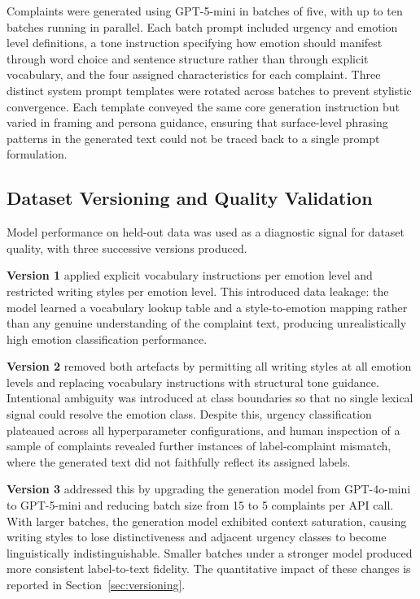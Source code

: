 \documentclass[11pt]{article}
\begin{document}
Complaints were generated using GPT-5-mini in batches of five, with up to ten batches
running in parallel. Each batch prompt included urgency and emotion level definitions,
a tone instruction specifying how emotion should manifest through word choice and
sentence structure rather than through explicit vocabulary, and the four assigned
characteristics for each complaint. Three distinct system prompt templates were rotated
across batches to prevent stylistic convergence. Each template conveyed the same core
generation instruction but varied in framing and persona guidance, ensuring that
surface-level phrasing patterns in the generated text could not be traced back to a
single prompt formulation.

\subsection{Dataset Versioning and Quality Validation}

Model performance on held-out data was used as a diagnostic signal for dataset quality,
with three successive versions produced.

\textbf{Version 1} applied explicit vocabulary instructions per emotion level and
restricted writing styles per emotion level. This introduced data leakage: the model
learned a vocabulary lookup table and a style-to-emotion mapping rather than any
genuine understanding of the complaint text, producing unrealistically high emotion
classification performance.

\textbf{Version 2} removed both artefacts by permitting all writing styles at all
emotion levels and replacing vocabulary instructions with structural tone guidance.
Intentional ambiguity was introduced at class boundaries so that no single lexical
signal could resolve the emotion class. Despite this, urgency classification plateaued
across all hyperparameter configurations, and human inspection of a sample of complaints
revealed further instances of label-complaint mismatch, where the generated text did
not faithfully reflect its assigned labels.

\textbf{Version 3} addressed this by upgrading the generation model from GPT-4o-mini to
GPT-5-mini and reducing batch size from 15 to 5 complaints per API call. With larger
batches, the generation model exhibited context saturation, causing writing styles to
lose distinctiveness and adjacent urgency classes to become linguistically
indistinguishable. Smaller batches under a stronger model produced more consistent
label-to-text fidelity. The quantitative impact of these changes is reported in
Section~\ref{sec:versioning}.
\end{document}
